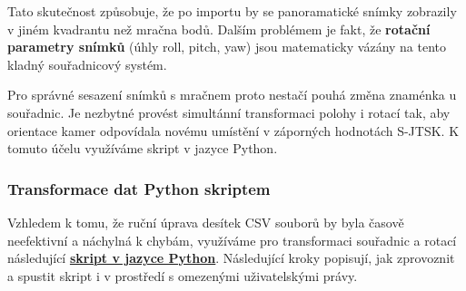 \documentclass{article}
\begin{document}
Tato skutečnost způsobuje, že po importu by se panoramatické snímky zobrazily v jiném kvadrantu než mračna bodů. Dalším problémem je fakt, že \textbf{rotační parametry snímků} (úhly roll, pitch, yaw) jsou matematicky vázány na tento kladný souřadnicový systém. 

Pro správné sesazení snímků s mračnem proto nestačí pouhá změna znaménka u souřadnic. Je nezbytné provést simultánní transformaci polohy i rotací tak, aby orientace kamer odpovídala novému umístění v záporných hodnotách S-JTSK. K tomuto účelu využíváme skript v jazyce Python.
\subsubsection{Transformace dat Python skriptem}
Vzhledem k tomu, že ruční úprava desítek CSV souborů by byla časově neefektivní a náchylná k chybám, využíváme pro transformaci souřadnic a rotací následující \href{https://github.com/polucifier/n4ce-panorama-metadata-fix/blob/main/XY%20do%20-X-Y.py}{\textbf{skript v jazyce Python}}.
Následující kroky popisují, jak zprovoznit a spustit skript i v prostředí s omezenými uživatelskými právy.
\end{document}
